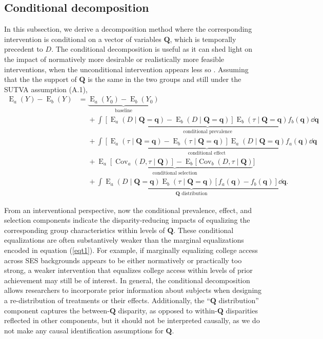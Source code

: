 \documentclass[12pt,a4paper]{article}
\newcommand{\Cov}{\operatorname{Cov}}
\newcommand{\E}{\operatorname{E}}
\def\Q{{\boldsymbol Q}}
\def\q{{\boldsymbol q}}
\begin{document}
\subsection{Conditional decomposition}
In this subsection, we derive a decomposition method where the corresponding intervention is conditional on a vector of variables $\boldsymbol{Q}$, which is temporally precedent to $D$. The conditional decomposition is useful as it  can shed light on the impact of normatively more desirable or realistically more feasible interventions, when the unconditional intervention appears less so \citep{jackson_meaningful_2021}.  
Assuming that the the support of $\Q$ is the same in the two groups and still under the SUTVA assumption (A.1),
\begin{align}
    \E_a(Y)-\E_b(Y) &= \underbrace{\E_a(Y_0)-\E_b(Y_0)}_{\text{baseline}} \nonumber \\
    &\phantom{{}={}} + \underbrace{\int [\E_a(D \mid \Q=\q)-\E_b(D \mid \Q=\q)]\E_b(\tau \mid \Q=\q) f_b(\q) \dd \q}_{\text{conditional prevalence}} \nonumber \\
    &\phantom{{}={}} + \underbrace{\int [\E_a(\tau \mid \Q=\q)-\E_b(\tau \mid \Q=\q)] \E_a(D \mid \Q=\q) f_a(\q) \dd \q}_{\text{conditional effect}} \nonumber \\
    &\phantom{{}={}} + \underbrace{\E_a[\Cov_a(D, \tau \mid \Q)] - \E_b[\Cov_b(D, \tau \mid \Q)}_{\text{conditional selection}}] \nonumber \\
    &\phantom{{}={}} + \underbrace{\int \E_a(D \mid \Q=\q) \E_b(\tau \mid \Q=\q) [f_a(\q)-f_b(\q)] \dd \q}_{\text{$\Q$ distribution}}.
\end{align}

From an interventional perspective, now the conditional prevalence, effect, and selection components indicate the disparity-reducing impacts of equalizing the corresponding group characteristics within levels of $\Q$. These conditional equalizations are often substantively weaker than the marginal equalizations encoded in equation (\ref{eqt1}). For example, if marginally equalizing college access across SES backgrounds appears to be either normatively or practically too strong, a weaker intervention that equalizes college access within levels of prior achievement may still be of interest. In general, the conditional decomposition allows researchers to incorporate prior information about subjects when designing a re-distribution of treatments or their effects. Additionally, the ``$\Q$ distribution'' component captures the between-$\Q$ disparity, as opposed to within-$\Q$ disparities reflected in other components, but it should not be interpreted causally, as we do not make any causal identification assumptions for $\Q$.
\end{document}
